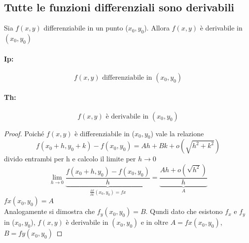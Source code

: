 \subsection{Tutte le funzioni differenziali sono derivabili}
Sia $f(x,y)$ differenziabile in un punto ($x_0,y_0$). Allora $f(x,y)$ è derivabile in
$(x_0,y_0)$
\begin{multicols}{2}
  \paragraph{Ip:}
  \begin{equation*}
    f(x,y) \text{ differenziabile in } (x_0,y_0)
  \end{equation*}
  \paragraph{Th:}
  \begin{equation*}
    f(x,y) \text{ è derivabile in } (x_0,y_0)
  \end{equation*}
\end{multicols}
\begin{proof}
  Poiché $f(x,y)$ è differenziabile in ($x_0,y_0$) vale la relazione
  \begin{equation*}
    f(x_0+h,y_0+k) - f(x_0,y_0)=Ah+Bk+o(\sqrt{h^2+k^2})
  \end{equation*}
  divido entrambi per h e calcolo il limite per $h\to 0$
  \begin{equation*}
    \lim\limits_{h \to 0}\underbrace{\frac{f(x_0+h,y_0) - f(x_0,y_0)}{h}}_{\frac{\partial f}{\partial x}(x_0,y_0)=fx}=\underbrace{\frac{Ah+o(\sqrt{h^2})}{h}}_A
  \end{equation*}
  $fx(x_0,y_0)=A$\\
  Analogamente si dimostra che $f_y(x_0,y_0)=B$. Qundi dato che esistono $f_x$ e $f_y$ in ($x_0,y_0$), $f(x,y)$ è derivabile in $(x_0,y_0)$ e in oltre $A=fx(x_0,y_0)$, $B=fy(x_0,y_0)$
\end{proof}
